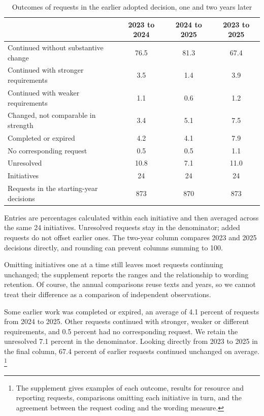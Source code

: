 \documentclass[12pt,authoryear]{elsarticle}
\begin{document}
\begin{table}[!ht]
\centering
\caption{Outcomes of requests in the earlier adopted decision, one and two years later}
\label{tab:adopted-continuity}
\begin{tabularx}{\textwidth}{>{\raggedright\arraybackslash}Xccc}
\toprule
 & 2023 to 2024 & 2024 to 2025 & 2023 to 2025 \\
\midrule
Continued without substantive change & 76.5 & 81.3 & 67.4 \\
Continued with stronger requirements & 3.5 & 1.4 & 3.9 \\
Continued with weaker requirements & 1.1 & 0.6 & 1.2 \\
Changed, not comparable in strength & 3.4 & 5.1 & 7.5 \\
Completed or expired & 4.2 & 4.1 & 7.9 \\
No corresponding request & 0.5 & 0.5 & 1.1 \\
Unresolved & 10.8 & 7.1 & 11.0 \\
\addlinespace
Initiatives & 24 & 24 & 24 \\
Requests in the starting-year decisions & 873 & 870 & 873 \\
\bottomrule
\end{tabularx}
\begin{minipage}{.97\textwidth}\footnotesize Entries are percentages calculated within each initiative and then averaged across the same 24 initiatives. Unresolved requests stay in the denominator; added requests do not offset earlier ones. The two-year column compares 2023 and 2025 decisions directly, and rounding can prevent columns summing to 100.\end{minipage}
\end{table}
\FloatBarrier

Omitting initiatives one at a time still leaves most requests continuing unchanged; the supplement reports the ranges and the relationship to wording retention. Of course, the annual comparisons reuse texts and years, so we cannot treat their difference as a comparison of independent observations.

Some earlier work was completed or expired, an average of 4.1 percent of requests from 2024 to 2025. Other requests continued with stronger, weaker or different requirements, and 0.5 percent had no corresponding request. We retain the unresolved 7.1 percent in the denominator. Looking directly from 2023 to 2025 in the final column, 67.4 percent of earlier requests continued unchanged on average. \footnote{The supplement gives examples of each outcome, results for resource and reporting requests, comparisons omitting each initiative in turn, and the agreement between the request coding and the wording measure.}
\end{document}
